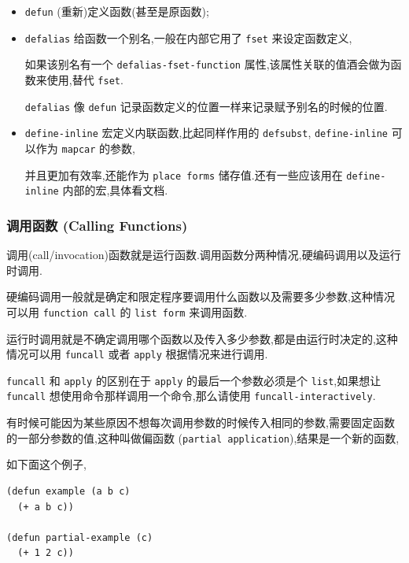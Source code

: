 \documentclass[11pt]{article}
\begin{document}
\begin{itemize}
\item \texttt{defun} (重新)定义函数(甚至是原函数);

\item \texttt{defalias} 给函数一个别名,一般在内部它用了 \texttt{fset} 来设定函数定义,

如果该别名有一个 \texttt{defalias-fset-function} 属性,该属性关联的值酒会做为函数来使用,替代 \texttt{fset}.

\texttt{defalias} 像 \texttt{defun} 记录函数定义的位置一样来记录赋予别名的时候的位置.

\item \texttt{define-inline} 宏定义内联函数,比起同样作用的 \texttt{defsubst}, \texttt{define-inline} 可以作为 \texttt{mapcar} 的参数,

并且更加有效率,还能作为 \texttt{place forms} 储存值.还有一些应该用在 \texttt{define-inline} 内部的宏,具体看文档.
\end{itemize}



\subsubsection{调用函数 (Calling Functions)}
\label{sec:orgd3b08af}

调用(call/invocation)函数就是运行函数.调用函数分两种情况,硬编码调用以及运行时调用.

硬编码调用一般就是确定和限定程序要调用什么函数以及需要多少参数,这种情况可以用 \texttt{function call} 的 \texttt{list form} 来调用函数.

运行时调用就是不确定调用哪个函数以及传入多少参数,都是由运行时决定的,这种情况可以用 \texttt{funcall} 或者 \texttt{apply} 根据情况来进行调用.

\texttt{funcall} 和 \texttt{apply} 的区别在于 \texttt{apply} 的最后一个参数必须是个 \texttt{list},如果想让 \texttt{funcall} 想使用命令那样调用一个命令,那么请使用 \texttt{funcall-interactively}.

有时候可能因为某些原因不想每次调用参数的时候传入相同的参数,需要固定函数的一部分参数的值,这种叫做偏函数 (\texttt{partial application}),结果是一个新的函数,

如下面这个例子,

\begin{verbatim}
(defun example (a b c)
  (+ a b c))

(defun partial-example (c)
  (+ 1 2 c))
\end{verbatim}
\end{document}
